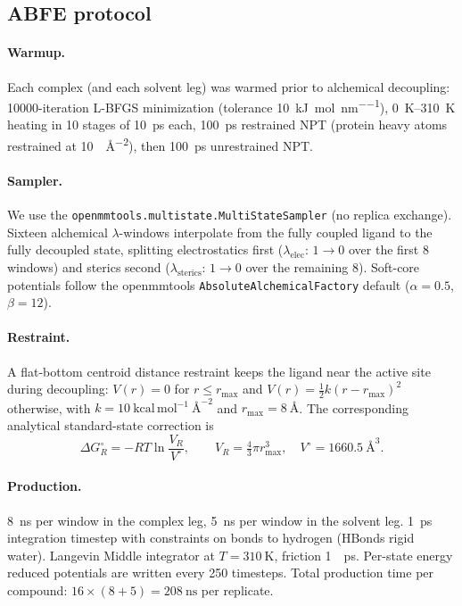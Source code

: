 \documentclass[11pt,a4paper]{article}
\newcommand{\dG}{\Delta G}
\newcommand{\kcalmol}{\mathrm{kcal\,mol^{-1}}}
\begin{document}
\subsection{ABFE protocol}
\label{sec:methods-abfe}

\paragraph{Warmup.} Each complex (and each solvent leg) was warmed
prior to alchemical decoupling: 10000-iteration L-BFGS minimization
(tolerance \SI{10}{\kilo\joule\per\mol\per\nano\meter}),
\SIrange{0}{310}{\kelvin} heating in 10 stages of \SI{10}{\pico\second}
each, \SI{100}{\pico\second} restrained NPT (protein heavy atoms
restrained at \SI{10}{\kcalmol\per\angstrom\squared}), then
\SI{100}{\pico\second} unrestrained NPT.

\paragraph{Sampler.} We use the
\texttt{openmmtools.multistate.MultiStateSampler} (no replica exchange).
Sixteen alchemical $\lambda$-windows interpolate from the fully coupled
ligand to the fully decoupled state, splitting electrostatics first
($\lambda_{\mathrm{elec}}$: $1 \to 0$ over the first 8 windows) and
sterics second ($\lambda_{\mathrm{sterics}}$: $1 \to 0$ over the
remaining 8). Soft-core potentials follow the openmmtools
\texttt{AbsoluteAlchemicalFactory} default
($\alpha = 0.5$, $\beta = 12$).

\paragraph{Restraint.} A flat-bottom centroid distance restraint
keeps the ligand near the active site during decoupling: $V(r) = 0$ for
$r \leq r_{\max}$ and
$V(r) = \tfrac{1}{2} k (r - r_{\max})^2$ otherwise,
with $k = 10\ \kcalmol$\textperthousand$\ \unit{\angstrom}^{-2}$ and
$r_{\max} = 8\ \unit{\angstrom}$. The corresponding analytical
standard-state correction is
\begin{equation}
  \dG_R^\circ = -RT \ln\frac{V_R}{V^\circ},\qquad
  V_R = \tfrac{4}{3}\pi r_{\max}^3,\quad V^\circ = 1660.5\ \unit{\angstrom}^3.
\end{equation}

\paragraph{Production.} \SI{8}{\nano\second} per window in the complex
leg, \SI{5}{\nano\second} per window in the solvent leg.
\SI{1}{\pico\second} integration timestep with constraints on bonds to
hydrogen (HBonds rigid water). Langevin Middle integrator at
$T = \SI{310}{\kelvin}$, friction \SI{1}{\per\pico\second}.
Per-state energy reduced potentials are written every 250 timesteps.
Total production time per compound: $16 \times (8 + 5) = \SI{208}{\nano\second}$
per replicate.
\end{document}
